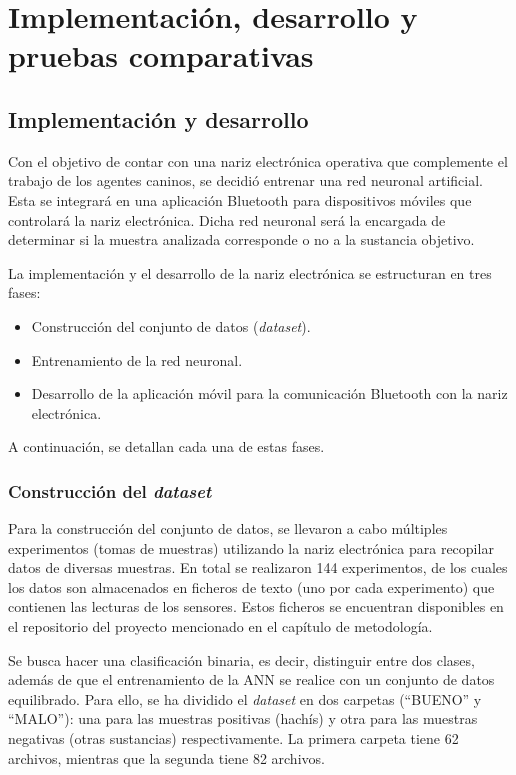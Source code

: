 ﻿\chapter{Implementación, desarrollo y pruebas comparativas}
\section{Implementación y desarrollo}
Con el objetivo de contar con una nariz electrónica operativa que complemente el trabajo de los agentes caninos, se decidió entrenar una red neuronal artificial. Esta se integrará en una aplicación Bluetooth para dispositivos móviles que controlará la nariz electrónica. Dicha red neuronal será la encargada de determinar si la muestra analizada corresponde o no a la sustancia objetivo.
\par

La implementación y el desarrollo de la nariz electrónica se estructuran en tres fases:
\begin{itemize}
    \item Construcción del conjunto de datos (\textit{dataset}).
    \item Entrenamiento de la red neuronal.
    \item Desarrollo de la aplicación móvil para la comunicación Bluetooth con la nariz electrónica.
\end{itemize}

A continuación, se detallan cada una de estas fases.

\subsection{Construcción del \textit{dataset}}
Para la construcción del conjunto de datos, se llevaron a cabo múltiples experimentos (tomas de muestras) utilizando la nariz electrónica para recopilar datos de diversas muestras. En total se realizaron 144 experimentos, de los cuales los datos son almacenados en ficheros de texto (uno por cada experimento) que contienen las lecturas de los sensores. Estos ficheros se encuentran disponibles en el repositorio del proyecto mencionado en el capítulo de metodología.
\par

Se busca hacer una clasificación binaria, es decir, distinguir entre dos clases, además de que el entrenamiento de la ANN se realice con un conjunto de datos equilibrado. Para ello, se ha dividido el \textit{dataset} en dos carpetas (``BUENO'' y ``MALO''): una para las muestras positivas (hachís) y otra para las muestras negativas (otras sustancias) respectivamente. La primera carpeta tiene 62 archivos, mientras que la segunda tiene 82 archivos.
\par

